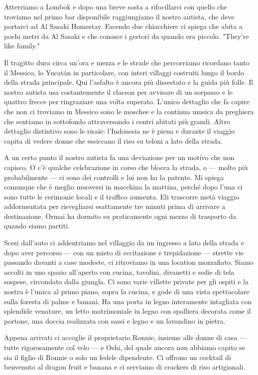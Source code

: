 Atterriamo a Lombok e dopo una breve sosta a rifocillarci con quello che troviamo nel primo bar disponibile raggiungiamo il nostro autista, che deve portarci ad Al Sasaki Homestay. Facendo due chiacchiere ci spiega che abita a pochi metri da Al Sasaki e che conosce i gestori da quando era piccolo. "They're like family."

Il tragitto dura circa un'ora e mezza e le strade che percorriamo ricordano tanto il Messico, lo Yucatán in particolare, con interi villaggi costruiti lungo il bordo della strada principale. Qui l'asfalto è ancora più dissestato e la guida più folle. Il nostro autista usa costantemente il clacson per avvisare di un sorpasso e le quattro frecce per ringraziare una volta superato. L'unico dettaglio che fa capire che non ci troviamo in Messico sono le moschee e la continua musica da preghiera che sentiamo in sottofondo attraversando i centri abitati più grandi. Altro dettaglio distintivo sono le risaie: l'Indonesia ne è piena e durante il viaggio capita di vedere donne che essiccano il riso su teloni a lato della strada.

A un certo punto il nostro autista fa una deviazione per un motivo che non capisco. O c'è qualche celebrazione in corso che blocca la strada, o — molto più probabilmente — ci sono dei controlli e lui non ha la patente. Mi spiega comunque che è meglio muoversi in macchina la mattina, perché dopo l'una ci sono tutte le cerimonie locali e il traffico aumenta. Eli trascorre metà viaggio addormentata per risvegliarsi esattamente tre minuti prima di arrivare a destinazione. Ormai ha dormito su praticamente ogni mezzo di trasporto da quando siamo partiti.

Scesi dall'auto ci addentriamo nel villaggio da un ingresso a lato della strada e dopo aver percorso — con un misto di eccitazione e trepidazione — strette vie passando davanti a case modeste, ci ritroviamo in una location mozzafiato. Siamo accolti in uno spazio all'aperto con cucina, tavolini, divanetti e sedie di tela sospese, circondato dalla giungla. Ci sono varie villette private per gli ospiti e la nostra è l'unica al primo piano, sopra la cucina, e gode di una vista spettacolare sulla foresta di palme e banani. Ha una porta in legno interamente intagliata con splendide venature, un letto matrimoniale in legno con spalliera decorata come il portone, una doccia realizzata con sassi e legno e un lavandino in pietra.

Appena arrivati ci accoglie il proprietario Ronnie, insieme alle donne di casa — tutte rigorosamente col velo — e Oshi, del quale ancora non abbiamo capito se sia il figlio di Ronnie o solo un fedele dipendente. Ci offrono un cocktail di benvenuto al dragon fruit e banana e ci serviamo di crackers di riso artigianali.

